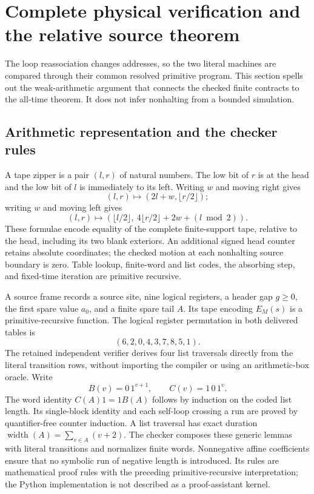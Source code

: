 \section{Complete physical verification and the relative source theorem}
\label{sec:relative}
The loop reassociation changes addresses, so the two literal machines are
compared through their common resolved primitive program. This section
spells out the weak-arithmetic argument that connects the checked finite
contracts to the all-time theorem. It does not infer nonhalting from a
bounded simulation.

\subsection{Arithmetic representation and the checker rules}
A tape zipper is a pair $(l,r)$ of natural numbers. The low bit of $r$ is
at the head and the low bit of $l$ is immediately to its left. Writing $w$
and moving right gives
\[
(l,r)\longmapsto(2l+w,\lfloor r/2\rfloor);
\]
writing $w$ and moving left gives
\[
(l,r)\longmapsto
 (\lfloor l/2\rfloor,\ 4\lfloor r/2\rfloor+2w+(l\bmod2)).
\]
These formulae encode equality of the complete finite-support tape,
relative to the head, including its two blank exteriors. An additional
signed head counter retains absolute coordinates; the checked motion at
each nonhalting source boundary is zero. Table lookup, finite-word and list
codes, the absorbing step, and fixed-time iteration are primitive recursive.

A source frame records a source site, nine logical registers, a header gap
$g\ge0$, the first spare value $a_0$, and a finite spare tail $A$. Its tape
encoding $E_M(s)$ is a primitive-recursive function. The logical register
permutation in both delivered tables is
\[
(6,2,0,4,3,7,8,5,1).
\]
The retained independent verifier derives four list traversals directly
from the literal transition rows, without importing the compiler or using
an arithmetic-box oracle. Write
\[
B(v)=0\,1^{v+1},\qquad C(v)=1\,0\,1^v.
\]
The word identity $C(A)1=1B(A)$ follows by induction on the coded list
length. Its single-block identity and each self-loop crossing a run are
proved by quantifier-free counter induction. A list traversal has exact
duration $\operatorname{width}(A)=\sum_{v\in A}(v+2)$.
The checker composes these generic lemmas with literal transitions and
normalizes finite words. Nonnegative affine coefficients ensure that no
symbolic run of negative length is introduced. Its rules are mathematical
proof rules with the preceding primitive-recursive interpretation; the
Python implementation is not described as a proof-assistant kernel.


